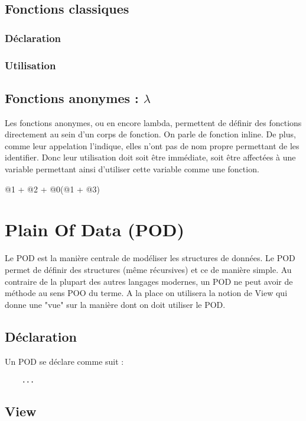 \documentclass{report}
\begin{document}
\section{Fonctions classiques}

\subsection{Déclaration}

\subsection{Utilisation}

\section{Fonctions anonymes : $\lambda$}
Les fonctions anonymes, ou en encore lambda, permettent de définir des 
fonctions directement au sein d'un corps de fonction. On parle de fonction inline.
De plus, comme leur appelation l'indique, elles n'ont pas de nom propre permettant 
de les identifier. Donc leur utilisation doit soit être immédiate, soit être affectées à 
une variable permettant ainsi d'utiliser cette variable comme une fonction.

@1 + @2 + @0(@1 + @3)



\chapter{Plain Of Data (POD)}

Le POD est la manière centrale de modéliser les structures de données. 
Le POD permet de définir des structures (même récursives) et ce de manière simple.
Au contraire de la plupart des autres langages modernes, un POD ne peut avoir de 
méthode au sens POO du terme. A la place on utilisera la notion de View qui donne 
une "vue" sur la manière dont on doit utiliser le POD. 

\section{Déclaration}

Un POD se déclare comme suit : 
\begin{verbatim}
    ...
\end{verbatim}

\section{View} 
\end{document}
